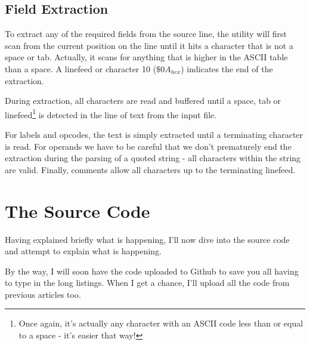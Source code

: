 \subsection{Field Extraction}

To extract any of the required fields from the source line, the utility will first scan from the current position on the line until it hits a character that is not a space or tab. Actually, it scans for anything that is higher in the ASCII table than a space. A linefeed or character 10 ($ \$0A_{hex} $) indicates the end of the extraction.

During extraction, all characters are read and buffered until a space, tab or linefeed\footnote{Once again, it's actually any character with an ASCII code less than or equal to a space - it's easier that way!} is detected in the line of text from the input file.

For labels and opcodes, the text is simply extracted until a terminating character is read. For operands we have to be careful that we don't prematurely end the extraction during the parsing of a quoted string - all characters within the string are valid. Finally, comments allow all characters up to the terminating linefeed.


\section{The Source Code}

Having explained briefly what is happening, I'll now dive into the source code and attempt to explain what is happening.

\begin{note}
By the way, I will soon have the code uploaded to Github to save you all having to type in the long listings. When I get a chance, I'll upload all the code from previous articles too.
\end{note}

